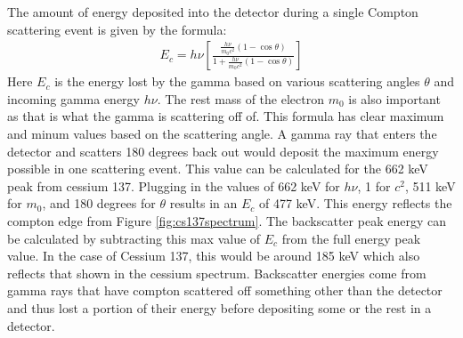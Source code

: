 The amount of energy deposited into the detector during a single Compton scattering event is given by the formula:
\begin{align}
  E_c=h\nu \left[ \frac{ \frac{h\nu}{m_0c^2}(1-\cos \theta ) }{1+\frac{h\nu}{m_0c^2}(1-\cos \theta )} \right]
\end{align}
Here $E_c$ is the energy lost by the gamma based on various scattering angles $\theta$ and incoming gamma energy $h\nu$.
The rest mass of the electron $m_0$ is also important as that is what the gamma is scattering off of.
This formula has clear maximum and minum values based on the scattering angle.
A gamma ray that enters the detector and scatters 180 degrees back out would deposit the maximum energy possible in one scattering event.
This value can be calculated for the 662 keV peak from cessium 137.
Plugging in the values of 662 keV for $h\nu$, 1 for $c^2$, 511 keV for $m_0$, and 180 degrees for $\theta$ results in an $E_c$ of 477 keV.
This energy reflects the compton edge from Figure \ref{fig:cs137spectrum}.
The backscatter peak energy can be calculated by subtracting this max value of $E_c$ from the full energy peak value.
In the case of Cessium 137, this would be around 185 keV which also reflects that shown in the cessium spectrum.
Backscatter energies come from gamma rays that have compton scattered off something other than the detector and thus lost a portion of their energy before depositing some or the rest in a detector.


